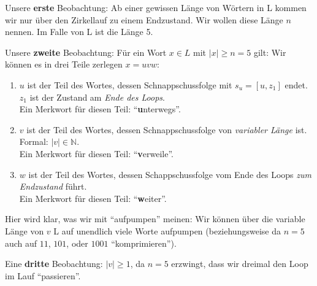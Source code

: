 Unsere \textbf{erste} Beobachtung:
Ab einer gewissen Länge von Wörtern in L kommen wir nur über den Zirkellauf zu einem
Endzustand.
Wir wollen diese Länge $n$ nennen. Im Falle von L ist die Länge 5.

Unsere \textbf{zweite} Beobachtung:
Für ein Wort $x \in L$ mit $|x| \geq n = 5$ gilt: Wir können es in drei Teile zerlegen
$x = uvw$:
\begin{enumerate}
    \item $u$ ist der Teil des Wortes,
        dessen Schnappschussfolge mit $s_u = [u,z_1]$ endet.
        $z_1$ ist der Zustand am \emph{Ende des Loops}.\\
        Ein Merkwort für diesen Teil: ``\textbf{u}nterwegs''.
    \item $v$ ist der Teil des Wortes,
        dessen Schnappschussfolge von \emph{variabler Länge} ist.
        Formal: $|v| \in \mathbb{N}$.\\
        Ein Merkwort für diesen Teil: ``\textbf{v}erweile''.
    \item $w$ ist der Teil des Wortes,
        dessen Schappschussfolge vom Ende des Loops \emph{zum Endzustand} führt.\\
        Ein Merkwort für diesen Teil: ``\textbf{w}eiter''.
\end{enumerate}
Hier wird klar, was wir mit ``aufpumpen'' meinen:
Wir können über die variable Länge von $v$ L auf unendlich viele Worte aufpumpen
(beziehungsweise da $n = 5$ auch auf $11$, $101$, oder $1001$ ``komprimieren'').

Eine \textbf{dritte} Beobachtung:
$|v| \geq 1$, da $n = 5$ erzwingt,
dass wir dreimal den Loop im Lauf ``passieren''.

